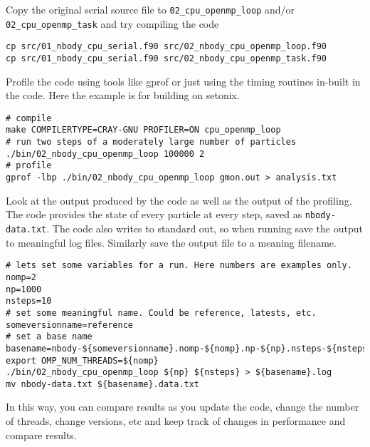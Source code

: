 \documentclass[11pt]{amsart}
\begin{document}
Copy the original serial source file to \texttt{02\_cpu\_openmp\_loop} and/or \texttt{02\_cpu\_openmp\_task} and try compiling the code
\begin{center}
\begin{minipage}{0.95\textwidth}
\begin{verbatim}
cp src/01_nbody_cpu_serial.f90 src/02_nbody_cpu_openmp_loop.f90
cp src/01_nbody_cpu_serial.f90 src/02_nbody_cpu_openmp_task.f90
\end{verbatim}
\end{minipage}
\end{center}
Profile the code using tools like gprof or just using the timing routines in-built in the code. 
Here the example is for building on setonix.
\begin{center}
\begin{minipage}{0.95\textwidth}
\begin{verbatim}
# compile
make COMPILERTYPE=CRAY-GNU PROFILER=ON cpu_openmp_loop
# run two steps of a moderately large number of particles 
./bin/02_nbody_cpu_openmp_loop 100000 2
# profile
gprof -lbp ./bin/02_nbody_cpu_openmp_loop gmon.out > analysis.txt
\end{verbatim}
\end{minipage}
\end{center}
Look at the output produced by the code as well as the output of the profiling. The code provides the state of every particle at every step, saved as {\color{blue}\texttt{nbody-data.txt}}. The code also writes to standard out, so when running save the output to meaningful log files. Similarly save the output file to a meaning filename.
\begin{center}
\begin{minipage}{0.95\textwidth}
\begin{verbatim}
# lets set some variables for a run. Here numbers are examples only.
nomp=2
np=1000
nsteps=10
# set some meaningful name. Could be reference, latests, etc.
someversionname=reference
# set a base name
basename=nbody-${someversionname}.nomp-${nomp}.np-${np}.nsteps-${nsteps}
export OMP_NUM_THREADS=${nomp}
./bin/02_nbody_cpu_openmp_loop ${np} ${nsteps} > ${basename}.log
mv nbody-data.txt ${basename}.data.txt
\end{verbatim}
\end{minipage}
\end{center}
In this way, you can compare results as you update the code, change the number of threads, change versions, etc and keep track of changes in performance and compare results.
\end{document}
